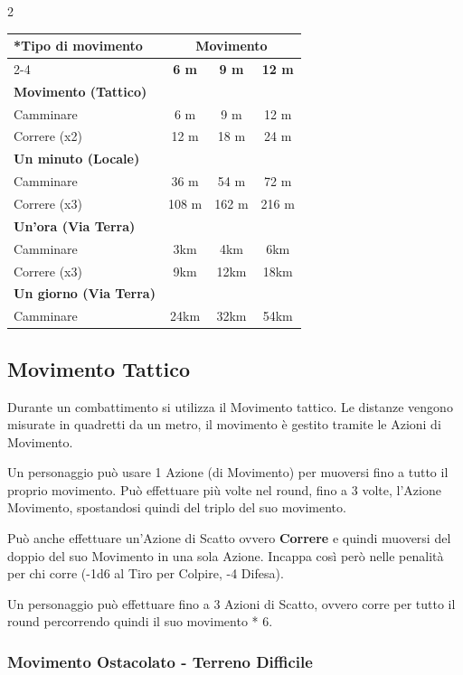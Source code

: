 \begin{multicols}{2}
{\small
\noindent\begin{tabularx}{\linewidth}{lccc}
	\toprule
\rowcolor{gray!20}\multirow{2}*{\textbf{Tipo di movimento}} &
\multicolumn{3}{c}{\textbf{Movimento}}\\
\cmidrule(lr){2-4} & \textbf{6 m}& \textbf{9 m} & \textbf{12 m}\\
\midrule
\rowcolor{gray!20}\textbf{Movimento (Tattico)}&&&\\
Camminare& 6 m & 9 m & 12 m\\
\rowcolor{gray!20}Correre (x2) & 12 m& 18 m& 24 m\\
\textbf{Un minuto (Locale)}&&& \\
\rowcolor{gray!20}Camminare & 36 m& 54 m& 72 m \\
Correre (x3) & 108 m & 162 m & 216 m \\
\rowcolor{gray!20}\textbf{Un'ora (Via Terra)}&&& \\
Camminare& 3km& 4km& 6km\\
\rowcolor{gray!20}Correre (x3) & 9km& 12km & 18km \\
\textbf{Un giorno (Via Terra)}&&&\\
\rowcolor{gray!20}Camminare& 24km & 32km & 54km
\end{tabularx}}

\subsection{Movimento Tattico}\label{movimentotattico}

Durante un combattimento si utilizza il Movimento tattico.
Le distanze vengono misurate in quadretti da un metro, il movimento è gestito tramite le Azioni di Movimento.

Un personaggio può usare 1 Azione (di Movimento) per muoversi fino a tutto il proprio movimento. Può effettuare più volte nel round, fino a 3 volte, l'Azione Movimento, spostandosi quindi del triplo del suo movimento.

Può anche effettuare un'Azione di Scatto ovvero \textbf{Correre} e quindi muoversi del doppio del suo Movimento in una sola Azione. Incappa così però nelle penalità per chi corre (-1d6 al Tiro per Colpire, -4 Difesa).

Un personaggio può effettuare fino a 3 Azioni di Scatto, ovvero corre per tutto il round percorrendo quindi il suo movimento * 6.

\subsubsection{Movimento Ostacolato - Terreno Difficile}\label{terrenodifficile}


\end{multicols}
